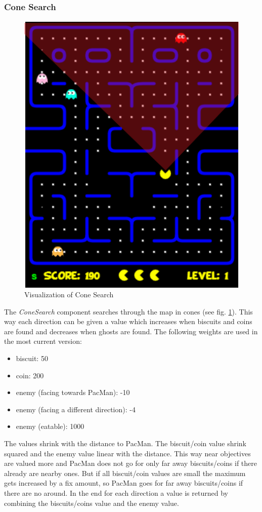 \subsubsection{Cone Search}
\begin{figure}
	\label{fig:cone}
	\centering
	\includegraphics[scale=0.65]{pictures/PacMan/Cone.png}
	\caption{Visualization of Cone Search}
\end{figure}
The \textit{ConeSearch} component searches through the map in cones (see fig. \ref{fig:cone}). This way each direction can be given a value which increases when biscuits and coins are found and decreases when ghosts are found. The following weights are used in the most current version:
\begin{itemize}
	\item biscuit: 50
	\item coin: 200
	\item enemy (facing towards PacMan): -10
	\item enemy (facing a different direction): -4
	\item enemy (eatable): 1000
\end{itemize}
The values shrink with the distance to PacMan. The biscuit/coin value shrink squared and the enemy value linear with the distance. This way near objectives are valued more and PacMan does not go for only far away biscuits/coins if there already are nearby ones. But if all biscuit/coin values are small the maximum gets increased by a fix amount, so PacMan goes for far away biscuits/coins if there are no around. In the end for each direction a value is returned by combining the biscuits/coins value and the enemy value. 
